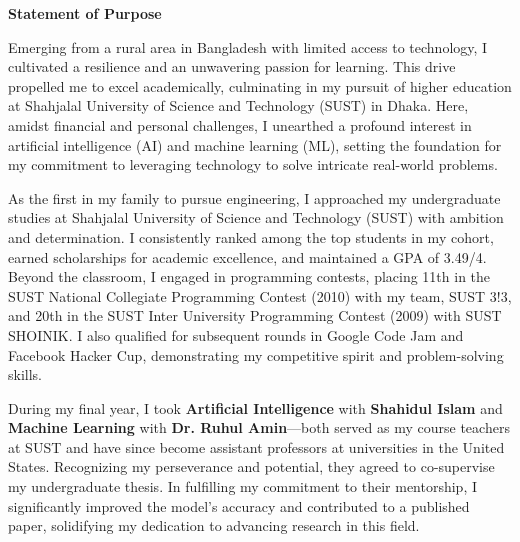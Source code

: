 \documentclass[11pt]{article}
\newif\ifshowsections
\begin{document}
\begin{center}
    {\Large \textbf{Statement of Purpose}}
\end{center}

\ifshowsections\section*{Introduction}\fi

Emerging from a rural area in Bangladesh with limited access to technology, I cultivated a resilience
and an unwavering passion for learning. This drive propelled me to excel academically, culminating
in my pursuit of higher education at Shahjalal University of Science and Technology (SUST) in Dhaka.
Here, amidst financial and personal challenges, I unearthed a profound interest in artificial intelligence
(AI) and machine learning (ML), setting the foundation for my commitment to leveraging technology to solve
intricate real-world problems.

\ifshowsections\section*{Academic Journey}\fi

As the first in my family to pursue engineering, I approached my undergraduate studies at Shahjalal University
of Science and Technology (SUST) with ambition and determination. I consistently ranked among the top students
in my cohort, earned scholarships for academic excellence, and maintained a GPA of 3.49/4. Beyond the classroom,
I engaged in programming contests, placing 11th in the SUST National Collegiate Programming Contest (2010) with
my team, SUST 3!3, and 20th in the SUST Inter University Programming Contest (2009) with SUST SHOINIK. I also
qualified for subsequent rounds in Google Code Jam and Facebook Hacker Cup, demonstrating my competitive spirit
and problem-solving skills.

During my final year, I took \textbf{Artificial Intelligence} with \textbf{Shahidul Islam} and \textbf{Machine
Learning} with \textbf{Dr. Ruhul Amin}—both served as my course teachers at SUST and have since become assistant
professors at universities in the United States. Recognizing my perseverance and potential, they agreed to
co-supervise my undergraduate thesis. In fulfilling my commitment to their mentorship, I significantly improved
the model’s accuracy and contributed to a published paper, solidifying my dedication to advancing research
in this field.
\end{document}
